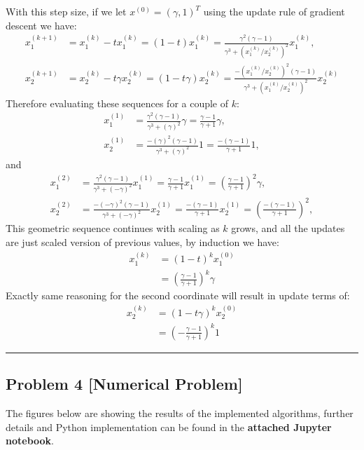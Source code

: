\documentclass[12pt, letterpaper, twoside]{article}
\begin{document}
With this step size, if we let $x^{(0)}=(\gamma, 1)^T$ using the update rule of gradient descent we have:
\begin{align*}
    x_1^{(k+1)} &= x_1^{(k)}-tx_1^{(k)}=(1-t)x_1^{(k)}=\frac{\gamma^2(\gamma-1)}{\gamma^3+(x_1^{(k)}/x_2^{(k)})^2}x_1^{(k)},\\
    x_2^{(k+1)} &= x_2^{(k)}-t\gamma x_2^{(k)}=(1-t\gamma)x_2^{(k)}=\frac{-(x_1^{(k)}/x_2^{(k)})^2(\gamma-1)}{\gamma^3+(x_1^{(k)}/x_2^{(k)})^2}x_2^{(k)}
\end{align*}
Therefore evaluating these sequences for a couple of $k$:
\begin{align*}
    x_1^{(1)} &=\frac{\gamma^2(\gamma-1)}{\gamma^3+(\gamma)^2}\gamma=\frac{\gamma-1}{\gamma+1}\gamma,\\
    x_2^{(1)} &= \frac{-(\gamma)^2(\gamma-1)}{\gamma^3+(\gamma)^2}1=\frac{-(\gamma-1)}{\gamma+1}1,
\end{align*}
and
\begin{align*}
    x_1^{(2)} &=\frac{\gamma^2(\gamma-1)}{\gamma^3+(-\gamma)^2}x_1^{(1)}=\frac{\gamma-1}{\gamma+1}x_1^{(1)}=(\frac{\gamma-1}{\gamma+1})^2\gamma,\\
    x_2^{(2)} &= \frac{-(-\gamma)^2(\gamma-1)}{\gamma^3+(-\gamma)^2}x_2^{(1)}=\frac{-(\gamma-1)}{\gamma+1}x_2^{(1)}=(\frac{-(\gamma-1)}{\gamma+1})^2,
\end{align*}
This geometric sequence continues with scaling as $k$ grows,
and all the updates are just scaled version of previous values, by induction we have:
\begin{align*}
    x_1^{(k)}&=(1-t)^{k}x_1^{(0)}\\
    &=\left(\frac{\gamma-1}{\gamma+1}\right)^k\gamma
\end{align*}
Exactly same reasoning for the second coordinate will result in update terms of:
\begin{align*}
    x_2^{(k)}&=(1-t\gamma )^{k}x_2^{(0)}\\
    &=\left(-\frac{\gamma-1}{\gamma+1}\right)^k1
\end{align*}
\hrule


\subsection*{Problem 4 \small[Numerical Problem]}
The figures below are showing the results of the implemented algorithms, further details and Python implementation can be found in the {\color{teal} \textbf{attached  Jupyter notebook}}.
\end{document}
